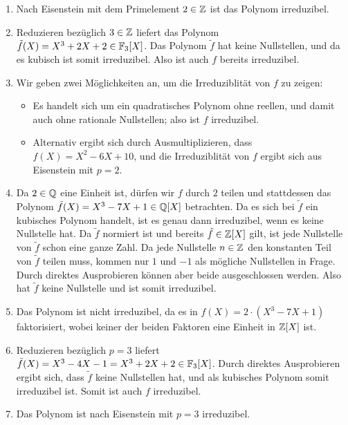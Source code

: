 \begin{solution}
  \begin{enumerate}
    \item
      Nach Eisenstein mit dem Primelement $2 \in \mathbb{Z}$ ist das Polynom irreduzibel.
    \item
      Reduzieren bezüglich $3 \in \mathbb{Z}$ liefert das Polynom $\tilde{f}(X) = X^3 + 2X + 2 \in \mathbb{F}_3[X]$.
      Das Polynom $\tilde{f}$ hat keine Nullstellen, und da es kubisch ist somit irreduzibel.
      Also ist auch $f$ bereits irreduzibel.
    \item
      Wir geben zwei Möglichkeiten an, um die Irreduziblität von $f$ zu zeigen:
      \begin{itemize}
        \item
          Es handelt sich um ein quadratisches Polynom ohne reellen, und damit auch ohne rationale Nullstellen;
          also ist $f$ irreduzibel.
        \item
          Alternativ ergibt sich durch Ausmultiplizieren, dass $f(X) = X^2 - 6X + 10$, und die Irreduziblität von $f$ ergibt sich aus Eisenstein mit $p = 2$.
      \end{itemize}
    \item
      Da $2 \in \mathbb{Q}$ eine Einheit ist, dürfen wir $f$ durch $2$ teilen und stattdessen das Polynom $\tilde{f}(X) = X^3 - 7X + 1 \in \mathbb{Q}[X]$ betrachten.
      Da es sich bei $\tilde{f}$ ein kubisches Polynom handelt, ist es genau dann irreduzibel, wenn es keine Nullstelle hat.
      Da $\tilde{f}$ normiert ist und bereits $\tilde{f} \in \mathbb{Z}[X]$ gilt, ist jede Nullstelle von $\tilde{f}$ schon eine ganze Zahl.
      Da jede Nullstelle $n \in \mathbb{Z}$ den konstanten Teil von $\tilde{f}$ teilen muss, kommen nur $1$ und $-1$ als mögliche Nullstellen in Frage. Durch direktes Ausprobieren können aber beide ausgeschlossen werden.
      Also hat $\tilde{f}$ keine Nullstelle und ist somit irreduzibel.
    \item
      Das Polynom ist nicht irreduzibel, da es in $f(X) = 2 \cdot (X^3 - 7X + 1)$ faktorisiert, wobei keiner der beiden Faktoren eine Einheit in $\mathbb{Z}[X]$ ist.
    \item
      Reduzieren bezüglich $p = 3$ liefert $\tilde{f}(X) = X^3 - 4X - 1 = X^3 + 2X + 2 \in \mathbb{F}_3[X]$.
      Durch direktes Ausprobieren ergibt sich, dass $\tilde{f}$ keine Nullstellen hat, und als kubisches Polynom somit irreduzibel ist.
      Somit ist auch $f$ irreduzibel.
    \item
      Das Polynom ist nach Eisenstein mit $p = 3$ irreduzibel.

\end{enumerate}
\end{solution}

